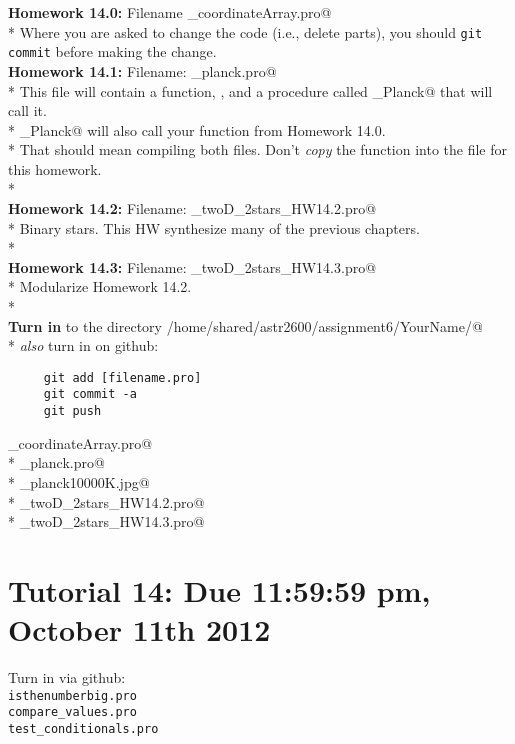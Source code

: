 \documentclass{article}
\begin{document}
\begin{spacing}{1.0}
 \textbf{Homework 14.0:} Filename \verb@yourName_coordinateArray.pro@\\* 
 Where you are asked to change the code (i.e., delete parts), you should
 \verb|git commit| before making the change.
 ~\\ 
 \textbf{Homework 14.1:} Filename: \verb@yourName_planck.pro@\\* 
 This file will contain a function, \verb@planck@, and a procedure called \verb@plot_Planck@ that will call it.\\* 
 \verb@plot_Planck@ will also call your \verb@coordinateArray@ function from Homework 14.0.\\* 
 That should mean compiling both files.  Don’t \emph{copy} the \verb@coordinateArray@ function into the file for this homework.\\* 
 ~\\ 
 \textbf{Homework 14.2:} Filename: \verb@yourName_twoD_2stars_HW14.2.pro@\\* 
 Binary stars.  This HW synthesize many of the previous chapters. \\* 
 ~\\ 
 \textbf{Homework 14.3:} Filename: \verb@yourName_twoD_2stars_HW14.3.pro@\\* 
 Modularize Homework 14.2.\\* 
 ~\\ 
 \textbf{Turn in} to the directory  \verb@ /home/shared/astr2600/assignment6/YourName/@\\* 
 \emph{also} turn in on github:
 \begin{lstlisting}
     git add [filename.pro]
     git commit -a
     git push
 \end{lstlisting}
 \verb@yourName_coordinateArray.pro@\\* 
 \verb@yourName_planck.pro@\\* 
 \verb@yourName_planck10000K.jpg@\\* 
 \verb@yourName_twoD_2stars_HW14.2.pro@\\* 
 \verb@yourName_twoD_2stars_HW14.3.pro@

 \section{Tutorial 14: Due 11:59:59 pm, October 11th 2012}
 Turn in via github:\\
 \verb|isthenumberbig.pro|\\
 \verb|compare_values.pro|\\
 \verb|test_conditionals.pro|\\
 
 
 \end{spacing}
 
\end{document}
